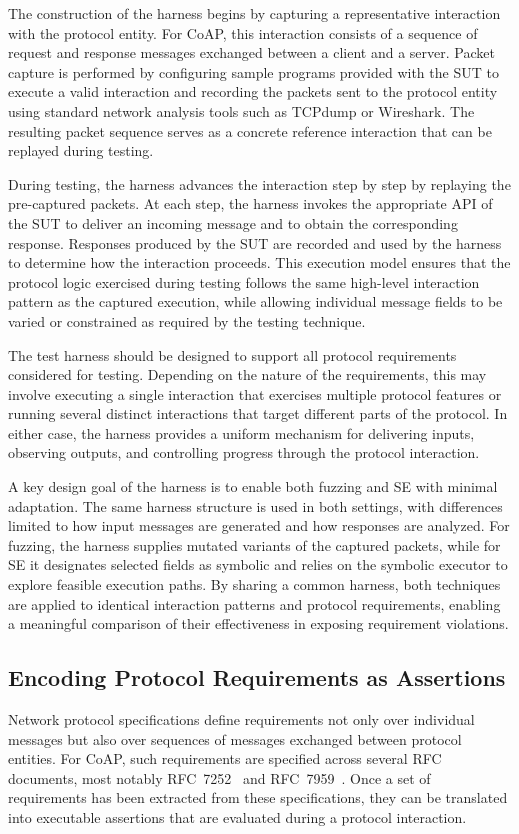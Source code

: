 The construction of the harness begins by capturing a representative interaction with the protocol entity.
For CoAP, this interaction consists of a sequence of request and response messages exchanged between a client and a server.
Packet capture is performed by configuring sample programs provided with the SUT to execute a valid interaction and recording the packets sent to the protocol entity using standard network analysis tools such as TCPdump or Wireshark.
The resulting packet sequence serves as a concrete reference interaction that can be replayed during testing.

During testing, the harness advances the interaction step by step by replaying the pre-captured packets.
At each step, the harness invokes the appropriate API of the SUT to deliver an incoming message and to obtain the corresponding response.
Responses produced by the SUT are recorded and used by the harness to determine how the interaction proceeds.
This execution model ensures that the protocol logic exercised during testing follows the same high-level interaction pattern as the captured execution, while allowing individual message fields to be varied or constrained as required by the testing technique.

The test harness should be designed to support all protocol requirements considered for testing.
Depending on the nature of the requirements, this may involve executing a single interaction that exercises multiple protocol features or running several distinct interactions that target different parts of the protocol.
In either case, the harness provides a uniform mechanism for delivering inputs, observing outputs, and controlling progress through the protocol interaction.

A key design goal of the harness is to enable both fuzzing and SE with minimal adaptation.
The same harness structure is used in both settings, with differences limited to how input messages are generated and how responses are analyzed.
For fuzzing, the harness supplies mutated variants of the captured packets, while for SE it designates selected fields as symbolic and relies on the symbolic executor to explore feasible execution paths.
By sharing a common harness, both techniques are applied to identical interaction patterns and protocol requirements, enabling a meaningful comparison of their effectiveness in exposing requirement violations.

\subsection{Encoding Protocol Requirements as Assertions}
Network protocol specifications define requirements not only over individual messages but also over sequences of messages exchanged between protocol entities.
For CoAP, such requirements are specified across several RFC documents, most notably RFC~7252~\cite{RFC7252} and RFC~7959~\cite{RFC7959}.
Once a set of requirements has been extracted from these specifications, they can be translated into executable assertions that are evaluated during a protocol interaction.

